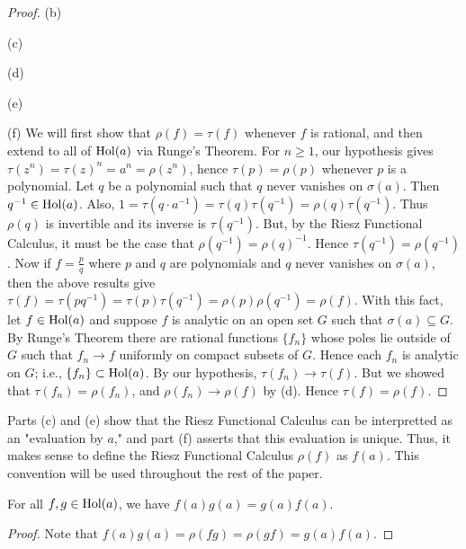 \begin{proof}
		{\color{red} (b)}

		{\color{red} (c)}

		{\color{red} (d)}

		{\color{red} (e)}

		(f) We will first show that $\rho(f) = \tau(f)$ whenever $f$ is rational, and then extend to all of $\operatorname{Hol}(a)$ via Runge's Theorem. For $n \geq 1$, our hypothesis gives $\tau(z^n) = \tau(z)^n = a^n = \rho(z^n)$, hence $\tau(p) = \rho(p)$ whenever $p$ is a polynomial. Let $q$ be a polynomial such that $q$ never vanishes on $\sigma(a)$. Then $q^{-1} \in \operatorname{Hol}(a)$. Also, $1 = \tau(q \cdot a^{-1}) = \tau(q) \tau(q^{-1}) = \rho(q)\tau(q^{-1})$. Thus $\rho(q)$ is invertible and its inverse is $\tau(q^{-1})$. But, by the Riesz Functional Calculus, it must be the case that $\rho(q^{-1}) = \rho(q)^{-1}$. Hence $\tau(q^{-1}) = \rho(q^{-1})$. Now if $f = \frac{p}{q}$ where $p$ and $q$ are polynomials and $q$ never vanishes on $\sigma(a)$, then the above results give $\tau(f) = \tau(pq^{-1})= \tau(p) \tau(q^{-1}) = \rho(p)\rho(q^{-1}) = \rho(f)$. With this fact, let $f \in \operatorname{Hol}(a)$ and suppose $f$ is analytic on an open set $G$ such that $\sigma(a) \subseteq G$. By Runge's Theorem there are rational functions $\{f_n\}$ whose poles lie outside of $G$ such that $f_n \rightarrow f$ uniformly on compact subsets of $G$. Hence each $f_n$ is analytic on $G$; i.e., $\{f_n\} \subset \operatorname{Hol}(a)$. By our hypothesis, $\tau(f_n) \rightarrow \tau(f)$. But we showed that $\tau(f_n) = \rho(f_n)$, and $\rho(f_n) \rightarrow \rho(f)$ by (d). Hence $\tau(f) = \rho(f)$.	
	\end{proof}

\begin{remark}
	Parts (c) and (e) show that the Riesz Functional Calculus can be interpretted as an "evaluation by $a$," and part (f) asserts that this evaluation is unique. Thus, it makes sense to define the Riesz Functional Calculus $\rho(f)$ as $f(a)$. This convention will be used throughout the rest of the paper.
\end{remark}

\begin{proposition}
	For all $f,g \in \operatorname{Hol}(a)$, we have $f(a)g(a) = g(a)f(a)$.
\end{proposition}
	\begin{proof}
		Note that $f(a)g(a) = \rho(fg) = \rho(gf) = g(a)f(a)$.
	\end{proof}

